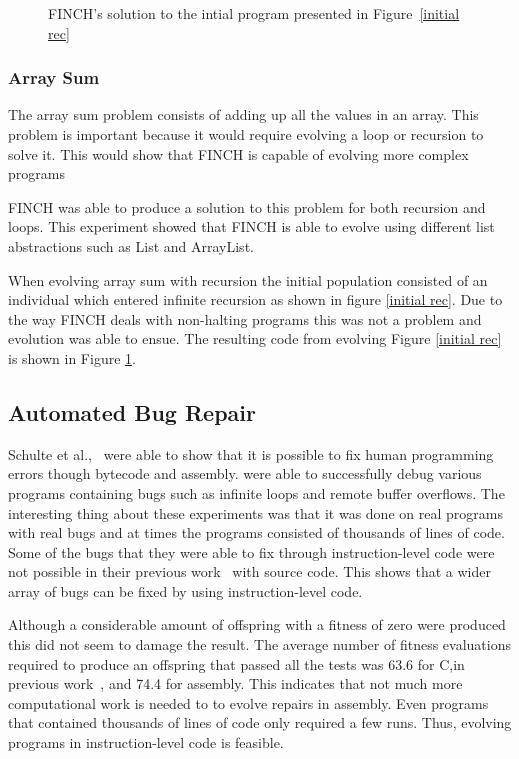 \documentclass{sig-alternate}
\begin{document}
\begin{figure}
\centering
{}
\caption{FINCH's solution to the intial program presented in Figure~\ref{initial rec}}
\label{final rec}
\end{figure}

\subsubsection{Array Sum}
The array sum problem consists of adding up all the values in an array. This problem is important because it would require evolving a loop or recursion to solve it. This would show that FINCH is capable of evolving more complex programs\par
FINCH was able to produce a solution to this problem for both recursion and loops. This experiment showed that FINCH is able to evolve using different list abstractions such as List and ArrayList.

When evolving array sum with recursion the initial population consisted of an individual which entered infinite recursion as shown in figure \ref{initial rec}. Due to the way FINCH deals with non-halting programs this was not a problem and evolution was able to ensue. The resulting code from evolving Figure \ref{initial rec} is shown in Figure \ref{final rec}.


\subsection{Automated Bug Repair}

Schulte et al.,~\cite{Assembly:2010} were able to show that it is possible to fix human programming errors though bytecode and assembly. \cite{Assembly:2010} were able to successfully debug various programs containing bugs such as infinite loops and remote buffer overflows. The interesting thing about these experiments was that it was done on real programs with real bugs and at times the programs consisted of thousands of lines of code. Some of the bugs that they were able to fix through instruction-level code were not possible in their previous work~\cite{Forrest:2009} with source code. This shows that a wider array of bugs can be fixed by using instruction-level code.

Although a considerable amount of offspring with a fitness of zero were produced this did not seem to damage the result. The average number of fitness evaluations required to produce an offspring that passed all the tests was 63.6 for C,in previous work~\cite{Forrest:2009}, and 74.4 for assembly. This indicates that not much more computational work is needed to to evolve repairs in assembly. Even programs that contained thousands of lines of code only required a few runs. Thus, evolving programs in instruction-level code is feasible.
 
\end{document}
